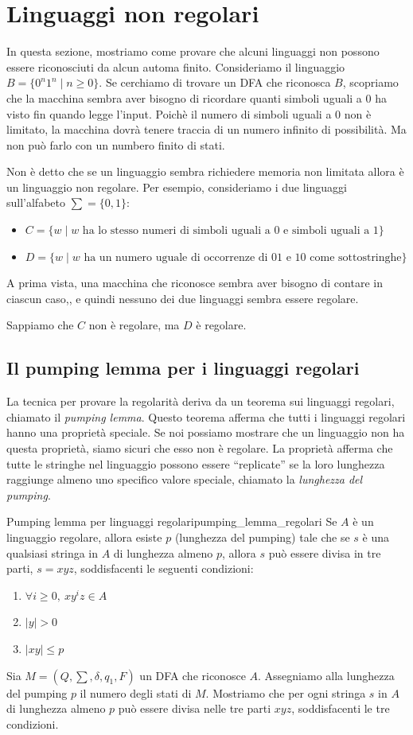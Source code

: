\documentclass[12pt]{report}
\newcounter{theorem}
\newcounter{lemma}
\newcommand{\nmu}{}
\begin{document}
	\section{Linguaggi non regolari}
	In questa sezione, mostriamo come provare che alcuni linguaggi non possono essere riconosciuti da alcun automa finito. Consideriamo il linguaggio $B = \{0^n1^n \mid n \geq 0\}$. Se cerchiamo di trovare un DFA che riconosca $B$, scopriamo che la macchina sembra aver bisogno di ricordare quanti simboli uguali a 0 ha visto fin quando legge l'input. Poichè il numero di simboli uguali a 0 non è limitato, la macchina dovrà tenere traccia di un numero infinito di possibilità. Ma non può farlo con un numbero finito di stati.


	Non è detto che se un linguaggio sembra richiedere memoria non limitata allora è un linguaggio non regolare. Per esempio, consideriamo i due linguaggi sull'alfabeto $\sum = \{0, 1\}$:
	\begin{itemize}
		\item $C = \{w \mid w \text{ ha lo stesso numeri di simboli uguali a 0 e simboli uguali a 1}\}$
		\item $D = \{w \mid w \text{ ha un numero uguale di occorrenze di 01 e 10 come sottostringhe}\}$
	\end{itemize}
	A prima vista, una macchina che riconosce sembra aver bisogno di contare in ciascun caso,, e quindi nessuno dei due linguaggi sembra essere regolare.

	Sappiamo che $C$ non è regolare, ma $D$ è regolare.
	\subsection{Il pumping lemma per i linguaggi regolari}
	La tecnica per provare la regolarità deriva da un teorema sui linguaggi regolari, chiamato il \textit{pumping lemma}. Questo teorema afferma che tutti i linguaggi regolari hanno una proprietà speciale. Se noi possiamo mostrare che un linguaggio non ha questa proprietà, siamo sicuri che esso non è regolare. La proprietà afferma che tutte le stringhe nel linguaggio possono essere ``replicate'' se la loro lunghezza raggiunge almeno uno specifico valore speciale, chiamato la \textit{lunghezza del pumping}.
	\begin{theorem}{\nmu Pumping lemma per linguaggi regolari}{pumping_lemma_regolari}
		Se $A$ è un linguaggio regolare, allora esiste $p$ (lunghezza del pumping) tale che se $s$ è una qualsiasi stringa in $A$ di lunghezza almeno $p$, allora $s$ può essere divisa in tre parti, $s = xyz$, soddisfacenti le seguenti condizioni:
		\begin{enumerate}
			\item $\forall i \geq 0,\ xy^iz \in A$
			\item $|y| > 0$
			\item $|xy| \leq p$
		\end{enumerate}
	\end{theorem}
	Sia $M = (Q, \sum, \delta, q_1, F)$ un DFA che riconosce $A$. Assegniamo alla lunghezza del pumping  $p$ il numero degli stati di $M$. Mostriamo che per ogni stringa $s$ in $A$ di lunghezza almeno $p$ può essere divisa nelle tre parti $xyz$, soddisfacenti le tre condizioni.
\end{document}
